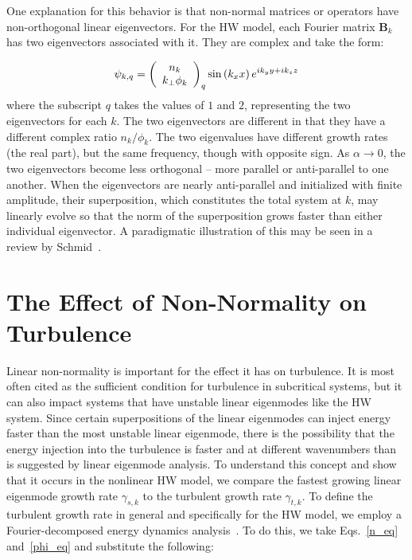 \documentclass[letter,scriptaddress,twocolumn, prl,showkeys]{revtex4}
\def\beq{\begin{equation}}
\def\eeq{\end{equation}}
\begin{document}
One explanation for this behavior is that non-normal matrices or operators have non-orthogonal linear eigenvectors. For the HW model, each Fourier matrix $\mathbf{B}_k$ has two eigenvectors associated
with it. They are complex and take the form:

\beq
\label{lin_eigen_form}
\psi_{k,q} = \left( \begin{array}{cc} n_k \\ k_\perp \phi_k \end{array} \right)_q {\rm sin} \left( k_x x \right) e^{i k_y y + i k_z z} 
\eeq
where the subscript $q$ takes the values of $1$ and $2$, representing the two eigenvectors for each $k$. The two eigenvectors are different in that they have a different complex ratio $n_k/\phi_k$.
The two eigenvalues have different growth rates (the real part), but the same frequency, though with opposite sign.
As $\alpha \to 0$, the two eigenvectors become less orthogonal -- more parallel or anti-parallel to one another. When the eigenvectors are nearly anti-parallel and initialized with finite amplitude,
their superposition, which constitutes the total system at $k$, may linearly evolve so that the norm of the superposition grows faster than either individual eigenvector. A paradigmatic illustration
of this may be seen in a review by Schmid~\cite{schmid2007}.

\section{The Effect of Non-Normality on Turbulence}

Linear non-normality is important for the effect it has on turbulence. It is most often cited as the sufficient condition for turbulence in subcritical systems, 
but it can also impact systems that have unstable linear eigenmodes like the HW system. Since certain superpositions of the linear eigenmodes can inject energy faster than the most unstable linear
eigenmode, there is the possibility that the energy injection into the turbulence is faster and at different wavenumbers than is suggested by linear eigenmode analysis. 
To understand this concept and show that it occurs in the nonlinear HW model, we compare the fastest growing linear eigenmode growth rate $\gamma_{s,k}$ to the turbulent growth rate $\gamma_{t,k}$. 
To define the turbulent growth rate in general and specifically for the HW model, we employ a Fourier-decomposed energy dynamics analysis~\cite{camargo1995,friedman2012b,friedman2013}. 
To do this, we take Eqs.~\ref{n_eq} and~\ref{phi_eq} and substitute the following:
\end{document}

